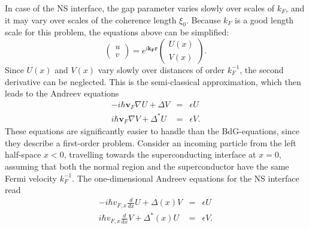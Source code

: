 In case of the NS interface, the gap parameter varies slowly over scales of $k_F$, and it may vary over scales of the coherence length $\xi_0$. Because $k_F$ is a good length scale for this problem, the equations above can be simplified:
\begin{equation}
\begin{pmatrix} u \\ v \end{pmatrix} = e^{i \mathbf{k_F} \mathbf{r} } \begin{pmatrix} U (x) \\ V(x) \end{pmatrix}.
\end{equation}
Since $U(x)$ and $V(x)$ vary slowly over distances of order $k_F^{-1}$, the second derivative can be neglected. This is the semi-classical approximation, which then leads to the Andreev equations
\begin{eqnarray}
- i \hbar \mathbf{v}_F \nabla U + \Delta V &=& \epsilon U \\
 i \hbar \mathbf{v}_F \nabla V + \Delta^* U &=& \epsilon V.
\end{eqnarray}
These equations are significantly easier to handle than the BdG-equations, since they describe a first-order problem.
\newline
\newline
Consider an incoming particle from the left half-space $x < 0 $, travelling towards the superconducting interface at $x=0$, assuming that both the normal region and the superconductor have the same Fermi velocity $k_F^{-1}$. The one-dimensional Andreev equations for the NS interface read
\begin{eqnarray}
- i \hbar v_{F, x} \frac{d}{dx} U + \Delta(x) V &=& \epsilon U \\
 i \hbar v_{F, x} \frac{d}{dx} V + \Delta^*(x) U &=& \epsilon V.
\end{eqnarray}

